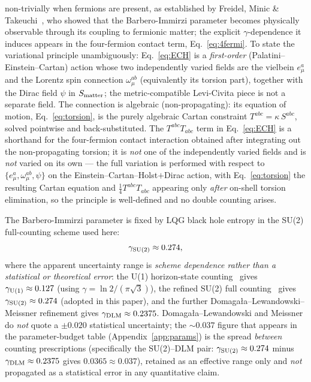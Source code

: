 \documentclass[aps,prd,twocolumn,superscriptaddress,showpacs,preprintnumbers,nofootinbib,longbibliography,floatfix]{revtex4-2}
\begin{document}
non-trivially when fermions are present, as established by
Freidel, Minic \& Takeuchi~\cite{Freidel2005}, who showed that the
Barbero-Immirzi parameter becomes physically observable through its coupling
to fermionic matter; the explicit $\gamma$-dependence it induces appears
in the four-fermion contact term, Eq.~\eqref{eq:4fermi}. To state the
variational principle unambiguously: Eq.~\eqref{eq:ECH} is a
\emph{first-order} (Palatini--Einstein--Cartan) action whose two
independently varied fields are the vielbein $e^a_\mu$ and the Lorentz
spin connection $\omega^{ab}_\mu$ (equivalently its torsion part), together
with the Dirac field $\psi$ in $S_{\rm matter}$; the metric-compatible
Levi-Civita piece is not a separate field. The connection is algebraic
(non-propagating): its equation of motion, Eq.~\eqref{eq:torsion}, is the
purely algebraic Cartan constraint $T^{abc}=\kappa\,S^{abc}$, solved
pointwise and back-substituted. The $T^{abc}T_{abc}$ term in Eq.~\eqref{eq:ECH} is a
shorthand for the four-fermion contact interaction obtained after integrating out
the non-propagating torsion; it is \emph{not} one of the independently
varied fields and is \emph{not} varied on its own --- the full variation is
performed with respect to $\{e^a_\mu,\omega^{ab}_\mu,\psi\}$ on the
Einstein--Cartan--Holst$+$Dirac action, with
Eq.~\eqref{eq:torsion} the resulting Cartan equation and
$\tfrac14 T^{abc}T_{abc}$ appearing only \emph{after} on-shell torsion
elimination, so the principle is well-defined and no double counting
arises.

The Barbero-Immirzi parameter is fixed by LQG black hole entropy in
the SU(2) full-counting scheme used here:
\begin{equation}\label{eq:gamma}
\gamma_{\rm SU(2)} \approx 0.274,
\end{equation}
where the apparent uncertainty range is
\emph{scheme dependence rather than a statistical or theoretical error}:
the U(1) horizon-state counting~\cite{ABCK1998} gives
$\gamma_{\rm U(1)}\approx 0.127$ (using $\gamma = \ln 2/(\pi\sqrt{3})$),
the refined SU(2) full counting~\cite{Domagala2004,Meissner2004} gives
$\gamma_{\rm SU(2)}\approx 0.274$ (adopted in this paper), and the
further Domaga\l{}a--Lewandowski--Meissner refinement gives
$\gamma_{\rm DLM}\approx 0.2375$. Domaga\l{}a--Lewandowski and Meissner
do \emph{not} quote a $\pm 0.020$ statistical uncertainty; the
$\sim\!0.037$ figure that appears in the parameter-budget table
(Appendix~\ref{app:params}) is the spread \emph{between} counting
prescriptions (specifically the SU(2)--DLM pair: $\gamma_{\rm SU(2)}\approx 0.274$
minus $\gamma_{\rm DLM}\approx 0.2375$ gives $0.0365 \approx 0.037$),
retained as an effective range only and
\emph{not} propagated as a statistical error in any quantitative claim.
\end{document}
